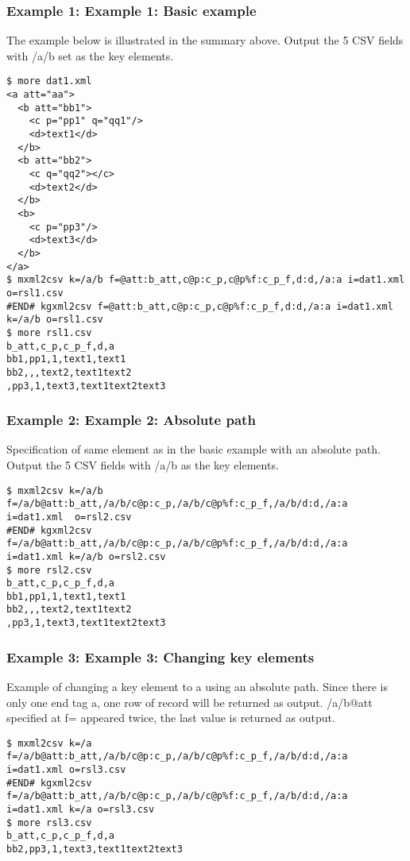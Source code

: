 \subsubsection*{Example 1: Example 1: Basic example}

The example below is illustrated in the summary above. Output the 5 CSV fields with /a/b set as the key elements.


\begin{Verbatim}[baselinestretch=0.7,frame=single]
$ more dat1.xml
<a att="aa">
  <b att="bb1">
    <c p="pp1" q="qq1"/>
    <d>text1</d>
  </b>
  <b att="bb2">
    <c q="qq2"></c>
    <d>text2</d>
  </b>
  <b>
    <c p="pp3"/>
    <d>text3</d>
  </b>
</a>
$ mxml2csv k=/a/b f=@att:b_att,c@p:c_p,c@p%f:c_p_f,d:d,/a:a i=dat1.xml  o=rsl1.csv
#END# kgxml2csv f=@att:b_att,c@p:c_p,c@p%f:c_p_f,d:d,/a:a i=dat1.xml k=/a/b o=rsl1.csv
$ more rsl1.csv
b_att,c_p,c_p_f,d,a
bb1,pp1,1,text1,text1
bb2,,,text2,text1text2
,pp3,1,text3,text1text2text3
\end{Verbatim}
\subsubsection*{Example 2: Example 2: Absolute path}

Specification of same element as in the basic example with an absolute path. Output the 5 CSV fields with /a/b as the key elements.


\begin{Verbatim}[baselinestretch=0.7,frame=single]
$ mxml2csv k=/a/b f=/a/b@att:b_att,/a/b/c@p:c_p,/a/b/c@p%f:c_p_f,/a/b/d:d,/a:a i=dat1.xml  o=rsl2.csv
#END# kgxml2csv f=/a/b@att:b_att,/a/b/c@p:c_p,/a/b/c@p%f:c_p_f,/a/b/d:d,/a:a i=dat1.xml k=/a/b o=rsl2.csv
$ more rsl2.csv
b_att,c_p,c_p_f,d,a
bb1,pp1,1,text1,text1
bb2,,,text2,text1text2
,pp3,1,text3,text1text2text3
\end{Verbatim}
\subsubsection*{Example 3: Example 3: Changing key elements}

Example of changing a key element to a using an absolute path. Since there is only one end tag a, one row of record will be returned as output. /a/b@att specified at f= appeared twice, the last value is returned as output.


\begin{Verbatim}[baselinestretch=0.7,frame=single]
$ mxml2csv k=/a f=/a/b@att:b_att,/a/b/c@p:c_p,/a/b/c@p%f:c_p_f,/a/b/d:d,/a:a i=dat1.xml o=rsl3.csv
#END# kgxml2csv f=/a/b@att:b_att,/a/b/c@p:c_p,/a/b/c@p%f:c_p_f,/a/b/d:d,/a:a i=dat1.xml k=/a o=rsl3.csv
$ more rsl3.csv
b_att,c_p,c_p_f,d,a
bb2,pp3,1,text3,text1text2text3
\end{Verbatim}
